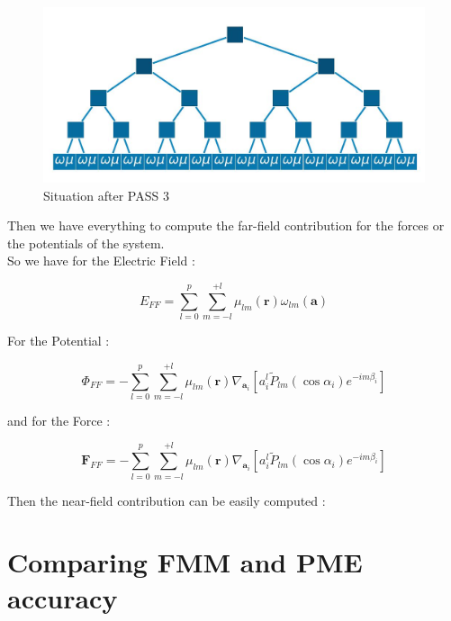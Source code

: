 \documentclass[11pt,twoside,a4paper]{report}
\begin{document}
\begin{figure}[H]
	\label{fig:farfield}
   \includegraphics[scale=0.5]{farfield}
    \centering 
    \caption{Situation after PASS 3 }
    
   \end{figure} 
   
   Then we have everything to compute the far-field contribution for the forces or the potentials of the system.\\
   
   So we have for the Electric Field :
      
   \begin{equation}
   E_{FF} = \sum\limits_{l=0}^{p} \sum\limits_{m=-l}^{+l} \mu_{lm}(\textbf{r}) \omega_{lm}(\textbf{a})
   \end{equation}
   
   For the Potential :
 
 	\begin{equation}
   \Phi_{FF} = - \sum\limits_{l=0}^{p} \sum\limits_{m=-l}^{+l} \mu_{lm}(\textbf{r}) \nabla_{\textbf{a}_i}[a_i^l \widetilde{P}_{lm}(\cos\alpha_i)e^{-im\beta_i}]
   \end{equation}
   
   and for the Force :
   
   \begin{equation}
   \textbf{F}_{FF} = - \sum\limits_{l=0}^{p} \sum\limits_{m=-l}^{+l} \mu_{lm}(\textbf{r}) \nabla_{\textbf{a}_i}[a_i^l \widetilde{P}_{lm}(\cos\alpha_i)e^{-im\beta_i}]
   \end{equation}
   
 Then the near-field contribution can be easily computed : 

 

\chapter{Comparing FMM and PME accuracy}
\end{document}
